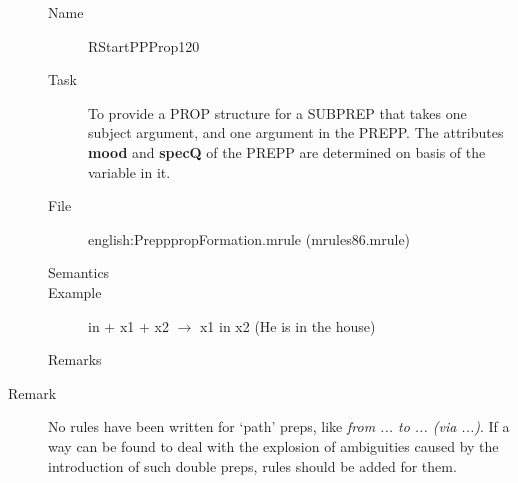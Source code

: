 \begin{description}
\vspace{1 cm}
\begin{description}
\item[Name] RStartPPProp120
\item[Task] To provide a PROP structure for a SUBPREP that takes one subject 
argument, and one argument in the PREPP. The attributes {\bf mood} and {\bf 
specQ} of the PREPP are determined on basis of the variable in it.
\item[File] english:PrepppropFormation.mrule (mrules86.mrule)
\item[Semantics]
\item[Example] in + x1 + x2 $\rightarrow$ x1 in x2 (He is in the house)
\item[Remarks]
\end{description}

\item[Remark] No rules have been written for `path' preps, like {\em from ... 
to ... (via ...)\/}. If a way can be found to deal with the explosion of 
ambiguities caused by the introduction of such double preps, rules should be 
added for them.

\end{description}

\newpage
